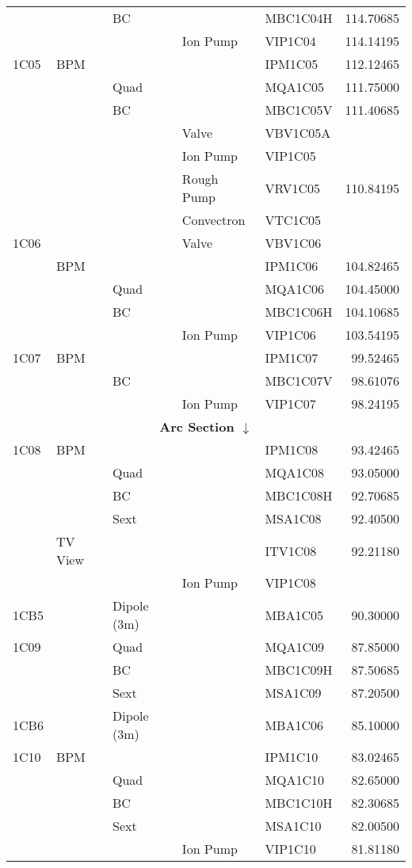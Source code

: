 {\begin{longtable}[hpt]{lllllr}
&& BC && MBC1C04H & 114.70685 \\
&&& Ion Pump & VIP1C04 & 114.14195 \\
1C05 & BPM &&& IPM1C05 & 112.12465 \\
&& Quad && MQA1C05 & 111.75000 \\
&& BC && MBC1C05V & 111.40685 \\
&&& Valve & VBV1C05A & \\
&&& Ion Pump & VIP1C05 & \\
&&& Rough Pump & VRV1C05 & 110.84195 \\
&&& Convectron & VTC1C05 & \\
1C06 &&& Valve & VBV1C06 & \\
& BPM &&& IPM1C06 & 104.82465 \\
&& Quad && MQA1C06 & 104.45000 \\
&& BC && MBC1C06H & 104.10685 \\
&&& Ion Pump & VIP1C06 & 103.54195 \\
1C07 & BPM &    &          & IPM1C07  & 99.52465 \\
     &     & BC &          & MBC1C07V & 98.61076 \\
     &     &    & Ion Pump & VIP1C07  & 98.24195 \\
\hline \multicolumn{6}{c}{{\bf Arc Section $\downarrow$}} \\ \hline 
1C08 & BPM &&& IPM1C08 & 93.42465 \\
&& Quad && MQA1C08 & 93.05000 \\
&& BC && MBC1C08H & 92.70685 \\
&& Sext && MSA1C08 & 92.40500 \\
& TV View &&& ITV1C08 & 92.21180 \\
&&& Ion Pump & VIP1C08 & \\
1CB5 && Dipole (3m) && MBA1C05 & 90.30000 \\
1C09 && Quad && MQA1C09 & 87.85000 \\
&& BC && MBC1C09H & 87.50685 \\
&& Sext && MSA1C09 & 87.20500 \\
1CB6 && Dipole (3m) && MBA1C06 & 85.10000 \\
1C10 & BPM &&& IPM1C10 & 83.02465 \\
&& Quad && MQA1C10 & 82.65000 \\
&& BC && MBC1C10H & 82.30685 \\
&& Sext && MSA1C10 & 82.00500 \\
&&& Ion Pump & VIP1C10 & 81.81180 \\

\end{longtable}}
